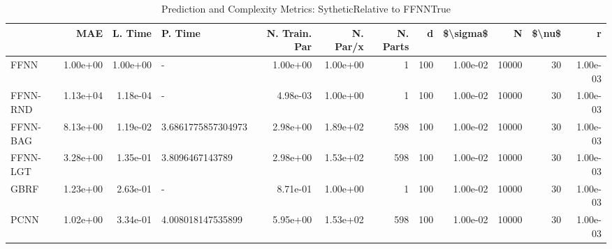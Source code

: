 \begin{table}
\centering
\caption{Prediction and Complexity Metrics: SytheticRelative to FFNNTrue}
\label{tab__Sythetic__Fix_Neurons_QTrue}
\begin{tabular}{lrrlrrrrrrrr}
\toprule
{} &      MAE &  L. Time &             P. Time &  N. Train. Par &  N. Par/x &  N. Parts &    d &  \$\textbackslash sigma\$ &      N &  \$\textbackslash nu\$ &        r \\
\midrule
FFNN     & 1.00e+00 & 1.00e+00 &                   - &       1.00e+00 &  1.00e+00 &         1 &  100 &  1.00e-02 &  10000 &     30 & 1.00e-03 \\
FFNN-RND & 1.13e+04 & 1.18e-04 &                   - &       4.98e-03 &  1.00e+00 &         1 &  100 &  1.00e-02 &  10000 &     30 & 1.00e-03 \\
FFNN-BAG & 8.13e+00 & 1.19e-02 &  3.6861775857304973 &       2.98e+00 &  1.89e+02 &       598 &  100 &  1.00e-02 &  10000 &     30 & 1.00e-03 \\
FFNN-LGT & 3.28e+00 & 1.35e-01 &     3.8096467143789 &       2.98e+00 &  1.53e+02 &       598 &  100 &  1.00e-02 &  10000 &     30 & 1.00e-03 \\
GBRF     & 1.23e+00 & 2.63e-01 &                   - &       8.71e-01 &  1.00e+00 &         1 &  100 &  1.00e-02 &  10000 &     30 & 1.00e-03 \\
PCNN     & 1.02e+00 & 3.34e-01 &   4.008018147535899 &       5.95e+00 &  1.53e+02 &       598 &  100 &  1.00e-02 &  10000 &     30 & 1.00e-03 \\
\bottomrule
\end{tabular}
\end{table}
